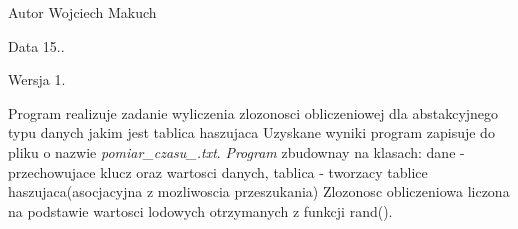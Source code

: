 \begin{DoxyAuthor}{Autor}
Wojciech Makuch 
\end{DoxyAuthor}
\begin{DoxyDate}{Data}
15.. 
\end{DoxyDate}
\begin{DoxyVersion}{Wersja}
1.
\end{DoxyVersion}
Program realizuje zadanie wyliczenia zlozonosci obliczeniowej dla abstakcyjnego typu danych jakim jest tablica haszujaca Uzyskane wyniki program zapisuje do pliku o nazwie {\itshape pomiar\+\_\+czasu\+\_.\+txt}. {\itshape Program} zbudownay na klasach\+: dane -\/ przechowujace klucz oraz wartosci danych, tablica -\/ tworzacy tablice haszujaca(asocjacyjna z mozliwoscia przeszukania) Zlozonosc obliczeniowa liczona na podstawie wartosci lodowych otrzymanych z funkcji rand(). 